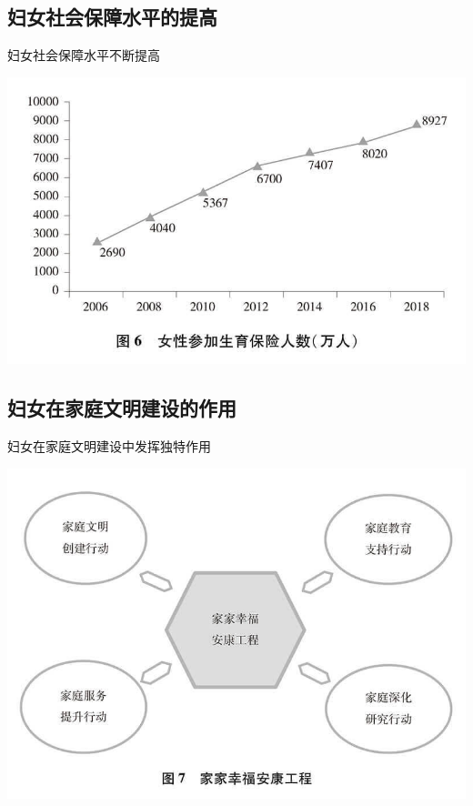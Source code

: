 \subsection{妇女社会保障水平的提高}
\begin{frame}{妇女社会保障水平不断提高}
    \begin{center}
        \includegraphics[width=.8\textwidth]{../docs/img/2-7.jpg}
    \end{center}
\end{frame}



\subsection{妇女在家庭文明建设的作用}
\begin{frame}{妇女在家庭文明建设中发挥独特作用}
    \begin{center}
        \includegraphics[width=.7\textwidth]{../docs/img/2-8.jpg}
    \end{center}
\end{frame}
